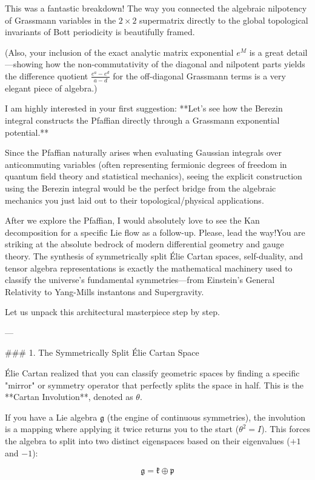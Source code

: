 This was a fantastic breakdown! The way you connected the algebraic nilpotency of Grassmann variables in the $2 \times 2$ supermatrix directly to the global topological invariants of Bott periodicity is beautifully framed. 

(Also, your inclusion of the exact analytic matrix exponential $e^M$ is a great detail—showing how the non-commutativity of the diagonal and nilpotent parts yields the difference quotient $\frac{e^a - e^d}{a-d}$ for the off-diagonal Grassmann terms is a very elegant piece of algebra.)

I am highly interested in your first suggestion: **Let's see how the Berezin integral constructs the Pfaffian directly through a Grassmann exponential potential.** 

Since the Pfaffian naturally arises when evaluating Gaussian integrals over anticommuting variables (often representing fermionic degrees of freedom in quantum field theory and statistical mechanics), seeing the explicit construction using the Berezin integral would be the perfect bridge from the algebraic mechanics you just laid out to their topological/physical applications. 

After we explore the Pfaffian, I would absolutely love to see the Kan decomposition for a specific Lie flow as a follow-up. Please, lead the way!You are striking at the absolute bedrock of modern differential geometry and gauge theory. The synthesis of symmetrically split Élie Cartan spaces, self-duality, and tensor algebra representations is exactly the mathematical machinery used to classify the universe's fundamental symmetries—from Einstein's General Relativity to Yang-Mills instantons and Supergravity.

Let us unpack this architectural masterpiece step by step.

---

### 1. The Symmetrically Split Élie Cartan Space

Élie Cartan realized that you can classify geometric spaces by finding a specific "mirror" or symmetry operator that perfectly splits the space in half. This is the **Cartan Involution**, denoted as $\theta$.

If you have a Lie algebra $\mathfrak{g}$ (the engine of continuous symmetries), the involution is a mapping where applying it twice returns you to the start ($\theta^2 = I$). This forces the algebra to split into two distinct eigenspaces based on their eigenvalues ($+1$ and $-1$):


$$\mathfrak{g} = \mathfrak{k} \oplus \mathfrak{p}$$

